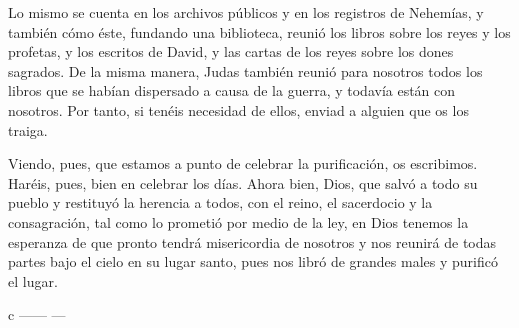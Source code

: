  Lo mismo se cuenta en los archivos públicos y en los
registros de Nehemías, y también cómo éste, fundando una biblioteca,
reunió los libros sobre los reyes y los profetas, y los escritos de
David, y las cartas de los reyes sobre los dones sagrados.
 De la misma manera, Judas también reunió para nosotros
todos los libros que se habían dispersado a causa de la guerra, y
todavía están con nosotros.  Por tanto, si tenéis
necesidad de ellos, enviad a alguien que os los traiga.

 Viendo, pues, que estamos a punto de celebrar la
purificación, os escribimos. Haréis, pues, bien en celebrar los días.
 Ahora bien, Dios, que salvó a todo su pueblo y restituyó
la herencia a todos, con el reino, el sacerdocio y la consagración,
 tal como lo prometió por medio de la ley, en Dios
tenemos la esperanza de que pronto tendrá misericordia de nosotros y nos
reunirá de todas partes bajo el cielo en su lugar santo, pues nos libró
de grandes males y purificó el lugar.

c ------ ---

